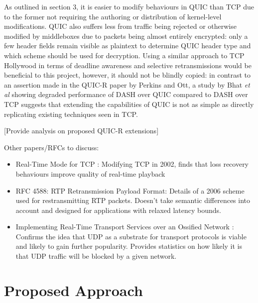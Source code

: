 \documentclass{mprop}
\begin{document}
As outlined in section 3, it is easier to modify behaviours in QUIC than TCP due to the former not requiring the authoring or distribution of kernel-level modifications. QUIC also suffers less from traffic being rejected or otherwise modified by middleboxes due to packets being almost entirely encrypted: only a few header fields remain visible as plaintext to determine QUIC header type and which scheme should be used for decryption. Using a similar approach to TCP Hollywood in terms of deadline awareness and selective retransmissions would be beneficial to this project, however, it should not be blindly copied: in contrast to an assertion made in the QUIC-R paper by Perkins and Ott, a study by Bhat \textit{et al} \cite{Bhat2017} showing degraded performance of DASH over QUIC compared to DASH over TCP suggests that extending the capabilities of QUIC is not as simple as directly replicating existing techniques seen in TCP.

[Provide analysis on proposed QUIC-R extensions]

Other papers/RFCs to discuss:
\begin{itemize}
  \item Real-Time Mode for TCP \cite{Liang2002}: Modifying TCP in 2002, finds that loss recovery 
  behaviours improve quality of real-time playback

  \item RFC 4588: RTP Retransmission Payload Format: Details of a 2006 scheme used for 
  restransmitting RTP packets. Doesn't take semantic differences into account and designed for 
  applications with relaxed latency bounds.

  \item Implementing Real-Time Transport Services over an Ossified Network 
  \cite {McQuistin2016Ossification}: Confirms the idea that UDP as a substrate for transport 
  protocols is viable and likely to gain further popularity. Provides statistics on how likely it 
  is that UDP traffic will be blocked by a given network.
\end{itemize}

\newpage

\section{Proposed Approach}

\end{document}

